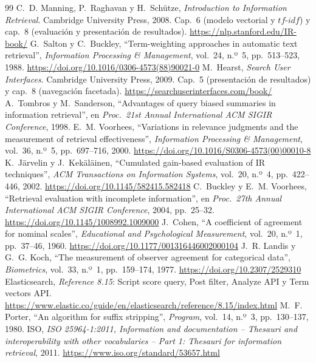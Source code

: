 \documentclass[11pt,spanish]{article}
\begin{document}
\begin{thebibliography}{99}
\setlength{\itemsep}{4pt}
 C.~D. Manning, P.~Raghavan y H.~Schütze, \textit{Introduction to Information Retrieval}. Cambridge University Press, 2008. Cap.~6 (modelo vectorial y $tf$-$idf$) y cap.~8 (evaluación y presentación de resultados). \url{https://nlp.stanford.edu/IR-book/}
 G.~Salton y C.~Buckley, ``Term-weighting approaches in automatic text retrieval'', \textit{Information Processing \& Management}, vol.~24, n.º~5, pp.~513--523, 1988. \url{https://doi.org/10.1016/0306-4573(88)90021-0}
 M.~Hearst, \textit{Search User Interfaces}. Cambridge University Press, 2009. Cap.~5 (presentación de resultados) y cap.~8 (navegación facetada). \url{https://searchuserinterfaces.com/book/}
 A.~Tombros y M.~Sanderson, ``Advantages of query biased summaries in information retrieval'', en \textit{Proc.\ 21st Annual International ACM SIGIR Conference}, 1998.
 E.~M. Voorhees, ``Variations in relevance judgments and the measurement of retrieval effectiveness'', \textit{Information Processing \& Management}, vol.~36, n.º~5, pp.~697--716, 2000. \url{https://doi.org/10.1016/S0306-4573(00)00010-8}
 K.~Järvelin y J.~Kekäläinen, ``Cumulated gain-based evaluation of IR techniques'', \textit{ACM Transactions on Information Systems}, vol.~20, n.º~4, pp.~422--446, 2002. \url{https://doi.org/10.1145/582415.582418}
 C.~Buckley y E.~M. Voorhees, ``Retrieval evaluation with incomplete information'', en \textit{Proc.\ 27th Annual International ACM SIGIR Conference}, 2004, pp.~25--32. \url{https://doi.org/10.1145/1008992.1009000}
 J.~Cohen, ``A coefficient of agreement for nominal scales'', \textit{Educational and Psychological Measurement}, vol.~20, n.º~1, pp.~37--46, 1960. \url{https://doi.org/10.1177/001316446002000104}
 J.~R. Landis y G.~G. Koch, ``The measurement of observer agreement for categorical data'', \textit{Biometrics}, vol.~33, n.º~1, pp.~159--174, 1977. \url{https://doi.org/10.2307/2529310}
 Elasticsearch, \textit{Reference 8.15}: Script score query, Post filter, Analyze API y Term vectors API. \url{https://www.elastic.co/guide/en/elasticsearch/reference/8.15/index.html}
 M.~F. Porter, ``An algorithm for suffix stripping'', \textit{Program}, vol.~14, n.º~3, pp.~130--137, 1980.
 ISO, \textit{ISO 25964-1:2011, Information and documentation -- Thesauri and interoperability with other vocabularies -- Part 1: Thesauri for information retrieval}, 2011. \url{https://www.iso.org/standard/53657.html}
\end{thebibliography}
\end{document}
